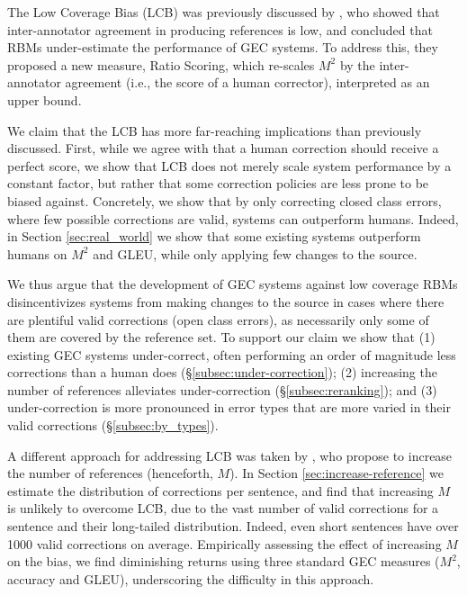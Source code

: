\documentclass[11pt, a4paper]{article}
\begin{document}
  The Low Coverage Bias (LCB) was previously discussed by \citet{bryant2015far}, 
  who showed that inter-annotator agreement in producing references is low, 
  and concluded that RBMs under-estimate the performance of GEC systems.
  To address this, they proposed a new measure, Ratio Scoring, which re-scales $M^2$ 
  by the inter-annotator agreement (i.e., the score of a human corrector), interpreted as an upper bound.

  We claim that the LCB has more far-reaching implications than previously discussed. 
  First, while we agree with \citet{bryant2015far} that a human correction should receive a perfect score, 
  we show that LCB does not merely scale system performance by a constant factor, but
  rather that some correction policies are less prone to be biased against. 
  Concretely, we show that by only correcting closed class errors, where few possible corrections are valid, systems can outperform humans. 
  Indeed, in Section \ref{sec:real_world} we show that some existing systems outperform humans on $M^2$ and GLEU, while only applying few changes to the source.
  
  We thus argue that the development of GEC systems against low coverage RBMs disincentivizes systems from making changes to the source 
  in cases where there are plentiful valid corrections (open class errors), as necessarily only some of them are covered by the reference set. 
  To support our claim we show that (1) existing GEC systems under-correct, often performing an order of magnitude less corrections than a human does (\S\ref{subsec:under-correction});
  (2) increasing the number of references alleviates under-correction (\S\ref{subsec:reranking});
  and (3) under-correction is more pronounced in error types that are more varied in their valid corrections (\S\ref{subsec:by_types}).
  
  A different approach for addressing LCB was taken by \cite{bryant2015far,sakaguchi2016reassessing},
  who propose to increase the number of references (henceforth, $M$).
  In Section \ref{sec:increase-reference} we estimate the distribution of corrections per sentence, 
  and find that increasing $M$ is unlikely to overcome LCB, due
  to the vast number of valid corrections for a sentence and their long-tailed distribution.
  Indeed, even short sentences have over 1000 valid corrections on average. 
  Empirically assessing the effect of increasing $M$ on the bias, we find diminishing returns using
  three standard GEC measures ($M^2$, accuracy and GLEU), underscoring the difficulty in this approach.
\end{document}

